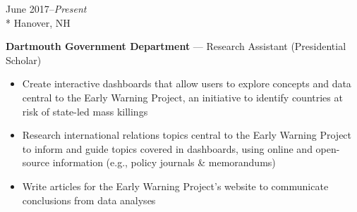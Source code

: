 \documentclass[a4paper,9pt]{article}
\begin{document}
\vspace{-3ex}
\begin{minipage}[t]{0.20\linewidth}
	\begin{small}
		\begin{spacing}{1.00}
			\begin{flushright}
				June 2017--\textit{Present}
				\\*
				\vspace*{2.5pt}
				Hanover, NH
			\end{flushright}
		\end{spacing}
	\end{small}
\end{minipage}
\hspace{4mm}
\begin{minipage}[t]{0.75\linewidth}
	\begin{small}
		\begin{spacing}{1.00}
			\begin{flushleft}
				\textbf{Dartmouth Government Department} --- Research Assistant (Presidential Scholar)
				\begin{itemize}[itemsep=0pt,topsep=2.5pt,leftmargin=*]
					\item Create interactive dashboards that allow users to explore concepts and data central to the Early Warning Project,
					      an initiative to identify countries at risk of state-led mass killings
					\item Research international relations topics central to the Early Warning Project to inform and guide topics covered in dashboards, using online and open-source information (e.g., policy journals \& memorandums)
					\item Write articles for the Early Warning Project's website to communicate conclusions from data analyses
				\end{itemize}
			\end{flushleft}
		\end{spacing}
	\end{small}
\end{minipage}
\end{document}
